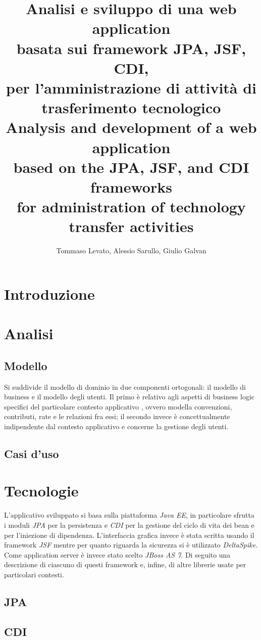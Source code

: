 \documentclass[italian,laurea,twoside,10pt]{UFtesi}
\title{Analisi e sviluppo di una web application \\
basata sui framework JPA, JSF, CDI, \\
per l'amministrazione di attività di trasferimento tecnologico\\\vspace{1.5cm}
Analysis and development of a web application \\
based on the JPA, JSF, and CDI frameworks \\
for administration of technology transfer activities
}
\author{Tommaso Levato, Alessio Sarullo, Giulio Galvan}
\date{}
\begin{document}
\maketitle
\frontmatter



\tableofcontents
\mainmatter
\chapter{Introduzione}

\chapter{Analisi}
\label{analisi}
\section{Modello}
Si suddivide il modello di dominio in due componenti ortogonali: il modello di business e il modello degli utenti. Il primo è relativo agli aspetti di business logic specifici del particolare contesto applicativo , 
ovvero modella convenzioni, contributi, rate e le relazioni fra essi; il secondo invece è concettualmente indipendente dal contesto applicativo e concerne la gestione degli utenti.



\section{Casi d'uso}

\chapter{Tecnologie}
L'applicativo sviluppato si basa sulla piattaforma \textsl{Java EE}, in particolare sfrutta i moduli \textsl{JPA} per la persistenza e \textsl{CDI} per la gestione del ciclo di vita dei bean e per l'iniezione di dipendenza. L'interfaccia grafica
invece è stata scritta usando il framework \textsl{JSF} mentre per quanto riguarda la sicurezza si è utilizzato \textsl{DeltaSpike}. Come application server è invece stato scelto \textsl{JBoss AS 7}. Di seguito una descrizione di ciascuno
di questi framework e, infine, di altre librerie usate per particolari contesti.
\label{tecnologie}
\section{JPA}
\label{jpa}

\section{CDI} 
\label{cdi}

\end{document}

